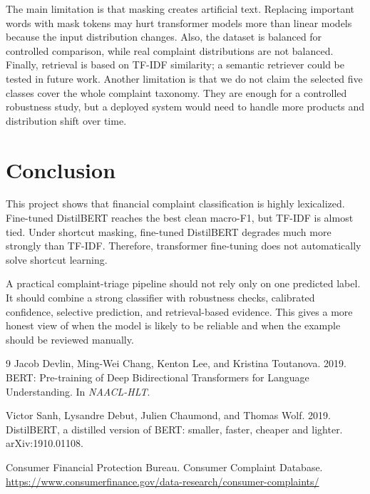\documentclass[11pt,twocolumn]{article}
\begin{document}
The main limitation is that masking creates artificial text. Replacing important words with mask tokens may hurt transformer models more than linear models because the input distribution changes. Also, the dataset is balanced for controlled comparison, while real complaint distributions are not balanced. Finally, retrieval is based on TF-IDF similarity; a semantic retriever could be tested in future work. Another limitation is that we do not claim the selected five classes cover the whole complaint taxonomy. They are enough for a controlled robustness study, but a deployed system would need to handle more products and distribution shift over time.

\section{Conclusion}
This project shows that financial complaint classification is highly lexicalized. Fine-tuned DistilBERT reaches the best clean macro-F1, but TF-IDF is almost tied. Under shortcut masking, fine-tuned DistilBERT degrades much more strongly than TF-IDF. Therefore, transformer fine-tuning does not automatically solve shortcut learning.

A practical complaint-triage pipeline should not rely only on one predicted label. It should combine a strong classifier with robustness checks, calibrated confidence, selective prediction, and retrieval-based evidence. This gives a more honest view of when the model is likely to be reliable and when the example should be reviewed manually.

\begin{thebibliography}{9}\small
{}
Jacob Devlin, Ming-Wei Chang, Kenton Lee, and Kristina Toutanova. 2019. BERT: Pre-training of Deep Bidirectional Transformers for Language Understanding. In \textit{NAACL-HLT}.

Victor Sanh, Lysandre Debut, Julien Chaumond, and Thomas Wolf. 2019. DistilBERT, a distilled version of BERT: smaller, faster, cheaper and lighter. arXiv:1910.01108.

Consumer Financial Protection Bureau. Consumer Complaint Database. \url{https://www.consumerfinance.gov/data-research/consumer-complaints/}
\end{thebibliography}
\end{document}
